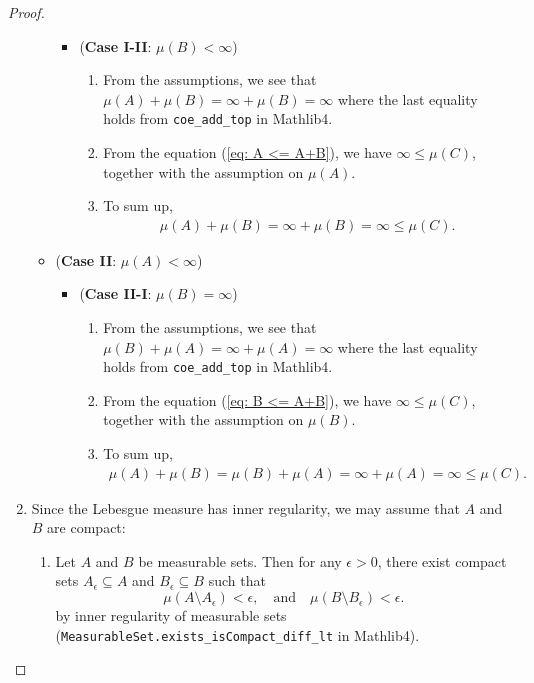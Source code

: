 \begin{proof}
\begin{enumerate}
\begin{itemize}
\begin{itemize}
                \item (\textbf{Case I-II}: \(\mu(B) < \infty\))
                \begin{enumerate}
                    \item From the assumptions, we see that \(\mu(A) + \mu(B) = {\infty + \mu(B) = \infty}\) where the last equality holds from \texttt{coe\_add\_top} in Mathlib4.
                    \item From the equation (\ref{eq: A <= A+B}), we have \(\infty \leq \mu(C)\), together with the assumption on \(\mu(A)\).
                    \item To sum up,
                    \begin{eqnarray*}
                        \mu(A) + \mu (B) = \infty + \mu(B) = \infty \leq \mu(C).
                    \end{eqnarray*}
                \end{enumerate}
            \end{itemize}
            \item (\textbf{Case II}: \(\mu(A) < \infty\))
            \begin{itemize}
                \item (\textbf{Case II-I}: \(\mu(B)=\infty\))
                \begin{enumerate}
                    \item From the assumptions, we see that \(\mu(B) + \mu(A) = {\infty + \mu(A) = \infty}\) where the last equality holds from \texttt{coe\_add\_top} in Mathlib4.
                    \item From the equation (\ref{eq: B <= A+B}), we have \(\infty \leq \mu(C)\), together with the assumption on \(\mu(B)\).
                    \item To sum up,
                    \begin{eqnarray*}
                        \mu(A) + \mu (B) = \mu(B) + \mu(A) = \infty + \mu(A) = \infty \leq \mu(C).
                    \end{eqnarray*}
                \end{enumerate}
            \end{itemize}
        \end{itemize}


        \item Since {the Lebesgue measure has inner regularity}, we may assume that \(A\) and \(B\) are compact:

        \begin{enumerate}
            \item Let \(A\) and \(B\) be measurable sets. Then for any \(\epsilon>0\), there exist compact sets \(A_\epsilon \subseteq A\) and \(B_\epsilon \subseteq B\) such that
            \begin{equation}
                \mu(A \setminus A_\epsilon)< \epsilon, \quad \text{and} \quad \mu(B \setminus B_\epsilon) < \epsilon.
                \label{eq: inner regularity}
            \end{equation}
            by inner regularity of measurable sets (\texttt{MeasurableSet.exists\_isCompact\_diff\_lt} in Mathlib4).


\end{enumerate}
\end{enumerate}
\end{proof}
